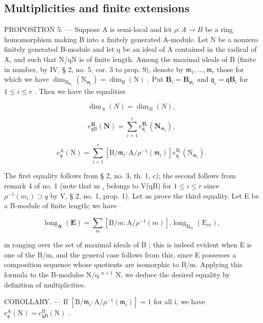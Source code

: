 \subsection{Multiplicities and finite extensions}

PROPOSITION 5. — Suppose A is semi-local and let \(\rho: A \to B\) be a ring homomorphism making B into a finitely generated A-module. Let N be a nonzero finitely generated B-module and let q be an ideal of A contained in the radical of A, and such that N/qN is of finite length. Among the maximal ideals of B (finite in number, by IV, § 2, no. 5, cor. 3 to prop. 9), denote by \(\mathfrak{m}_1, \ldots, \mathfrak{m}_r\) those for which we have \(\dim_{\mathrm{B}_{\mathfrak{m}_i}} (\mathrm{N}_{\mathfrak{m}_i}) = \dim_{\mathrm{B}} (\mathrm{N})\) . Put \(\mathbf{B}_i = \mathbf{B}_{\mathfrak{m}_i}\) and \(\mathfrak{q}_i = \mathfrak{q}\mathbf{B}_i\) for \(1 \leqslant i \leqslant r\) . Then we have the equalities

\[
\dim_ {A} (N) = \dim_ {B} (N),
\]

\[
e _ {\mathfrak {q} \mathrm{B}} ^ {\mathbf {B}} (\mathbf {N}) = \sum_ {i = 1} ^ {r} e _ {\mathfrak {q} _ {i}} ^ {\mathbf {B} _ {i}} (\mathbf {N} _ {\mathfrak {m} _ {i}}),
\]

\[
e _ {\mathfrak {q}} ^ {\mathrm{A}} (\mathrm{N}) = \sum_ {i = 1} ^ {r} \left[ \mathrm{B} / \mathfrak {m} _ {i}: \mathrm{A} / \rho^ {- 1} (\mathfrak {m} _ {i}) \right] e _ {\mathfrak {q} _ {i}} ^ {\mathrm{B} _ {i}} (\mathrm{N} _ {\mathfrak {m} _ {i}}).
\]

The first equality follows from § 2, no. 3, th. 1, c); the second follows from remark 4 of no. 1 (note that m \(_{i}\) belongs to V(qB) for \(1 \leqslant i \leqslant r\) since \(\rho^{-1}(m_{i}) \supset q\) by V, § 2, no. 1, prop. 1). Let us prove the third equality. Let E be a B-module of finite length; we have

\[
\operatorname{long} _ {\mathbf {A}} (\mathbf {E}) = \sum_ {m} \left[ \mathrm{B} / m: \mathrm{A} / \rho^ {- 1} (m) \right]. \operatorname{long} _ {\mathrm{B} _ {m}} \left(\mathrm{E} _ {m}\right),
\]

m ranging over the set of maximal ideals of B ; this is indeed evident when E is one of the B/m, and the general case follows from this, since E possesses a composition sequence whose quotients are isomorphic to B/m. Applying this formula to the B-modules N/q \(^{n+1}\) N, we deduce the desired equality by definition of multiplicities.

COROLLARY. — If \(\left[\mathrm{B}/\mathfrak{m}_{i}:\mathrm{A}/\rho^{-1}(\mathfrak{m}_{i})\right]=1\) for all i, we have \(e_{\mathfrak{q}}^{\mathrm{A}}(\mathrm{N})=e_{\mathfrak{q}\mathrm{B}}^{\mathrm{B}}(\mathrm{N})\) .

